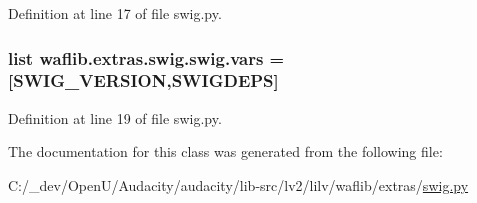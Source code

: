 Definition at line 17 of file swig.\+py.

\subsubsection[{\texorpdfstring{vars}{vars}}]{\setlength{\rightskip}{0pt plus 5cm}list waflib.\+extras.\+swig.\+swig.\+vars = \mbox{[}\textquotesingle{}S\+W\+I\+G\+\_\+\+V\+E\+R\+S\+I\+ON\textquotesingle{},\textquotesingle{}S\+W\+I\+G\+D\+E\+PS\textquotesingle{}\mbox{]}\hspace{0.3cm}{\ttfamily [static]}}\hypertarget{classwaflib_1_1extras_1_1swig_1_1swig_a2bca66555c896d99be4639d0ca4d9323}{}\label{classwaflib_1_1extras_1_1swig_1_1swig_a2bca66555c896d99be4639d0ca4d9323}


Definition at line 19 of file swig.\+py.



The documentation for this class was generated from the following file\+:\begin{DoxyCompactItemize}
\item 
C\+:/\+\_\+dev/\+Open\+U/\+Audacity/audacity/lib-\/src/lv2/lilv/waflib/extras/\hyperlink{lilv_2waflib_2extras_2swig_8py}{swig.\+py}\end{DoxyCompactItemize}
